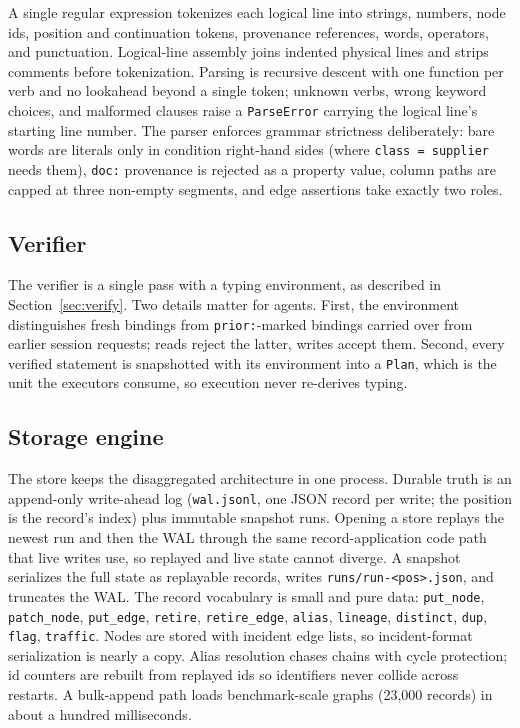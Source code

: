 \documentclass[11pt]{article}
\begin{document}
A single regular expression tokenizes each logical line into strings, numbers, node ids, position and continuation tokens, provenance references, words, operators, and punctuation. Logical-line assembly joins indented physical lines and strips comments before tokenization. Parsing is recursive descent with one function per verb and no lookahead beyond a single token; unknown verbs, wrong keyword choices, and malformed clauses raise a \texttt{ParseError} carrying the logical line's starting line number. The parser enforces grammar strictness deliberately: bare words are literals only in condition right-hand sides (where \texttt{class = supplier} needs them), \texttt{doc:} provenance is rejected as a property value, column paths are capped at three non-empty segments, and edge assertions take exactly two roles.

\subsection{Verifier}

The verifier is a single pass with a typing environment, as described in Section~\ref{sec:verify}. Two details matter for agents. First, the environment distinguishes fresh bindings from \texttt{prior:}-marked bindings carried over from earlier session requests; reads reject the latter, writes accept them. Second, every verified statement is snapshotted with its environment into a \texttt{Plan}, which is the unit the executors consume, so execution never re-derives typing.

\subsection{Storage engine}

The store keeps the disaggregated architecture in one process. Durable truth is an append-only write-ahead log (\texttt{wal.jsonl}, one JSON record per write; the position is the record's index) plus immutable snapshot runs. Opening a store replays the newest run and then the WAL through the same record-application code path that live writes use, so replayed and live state cannot diverge. A snapshot serializes the full state as replayable records, writes \texttt{runs/run-<pos>.json}, and truncates the WAL. The record vocabulary is small and pure data: \texttt{put\_node}, \texttt{patch\_node}, \texttt{put\_edge}, \texttt{retire}, \texttt{retire\_edge}, \texttt{alias}, \texttt{lineage}, \texttt{distinct}, \texttt{dup}, \texttt{flag}, \texttt{traffic}. Nodes are stored with incident edge lists, so incident-format serialization is nearly a copy. Alias resolution chases chains with cycle protection; id counters are rebuilt from replayed ids so identifiers never collide across restarts. A bulk-append path loads benchmark-scale graphs (23{,}000 records) in about a hundred milliseconds.
\end{document}
